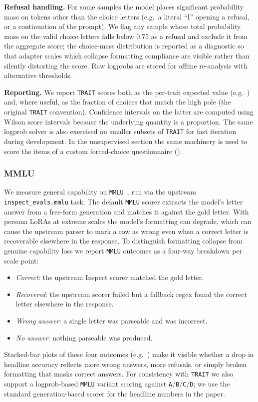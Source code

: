 \textbf{Refusal handling.}
For some samples the model places significant probability mass on tokens other than the choice letters (e.g.\ a literal ``I'' opening a refusal, or a continuation of the prompt). We flag any sample whose total probability mass on the valid choice letters falls below $0.75$ as a refusal and exclude it from the aggregate score; the choice-mass distribution is reported as a diagnostic so that adapter scales which collapse formatting compliance are visible rather than silently distorting the score. Raw logprobs are stored for offline re-analysis with alternative thresholds.

\textbf{Reporting.}
We report \texttt{TRAIT} scores both as the per-trait expected value (e.g.\ ) and, where useful, as the fraction of choices that match the high pole (the original \texttt{TRAIT} convention). Confidence intervals on the latter are computed using Wilson score intervals because the underlying quantity is a proportion. The same logprob solver is also exercised on smaller subsets of \texttt{TRAIT} for fast iteration during development. In the unsupervised section the same machinery is used to score the items of a custom forced-choice questionnaire ().

\subsubsection{MMLU}\label{sec:appendix-e-mcq-mmlu}

We measure general capability on \texttt{MMLU}~\citep{hendryckstest2021}, run via the upstream \texttt{inspect\_evals.mmlu} task. The default \texttt{MMLU} scorer extracts the model's letter answer from a free-form generation and matches it against the gold letter. With persona LoRAs at extreme scales the model's formatting can degrade, which can cause the upstream parser to mark a row as wrong even when a correct letter is recoverable elsewhere in the response. To distinguish formatting collapse from genuine capability loss we report \texttt{MMLU} outcomes as a four-way breakdown per scale point:
\begin{itemize}
    \item \emph{Correct}: the upstream Inspect scorer matched the gold letter.
    \item \emph{Recovered}: the upstream scorer failed but a fallback regex found the correct letter elsewhere in the response.
    \item \emph{Wrong answer}: a single letter was parseable and was incorrect.
    \item \emph{No answer}: nothing parseable was produced.
\end{itemize}
Stacked-bar plots of these four outcomes (e.g.\ ) make it visible whether a drop in headline accuracy reflects more wrong answers, more refusals, or simply broken formatting that masks correct answers. For consistency with \texttt{TRAIT} we also support a logprob-based \texttt{MMLU} variant scoring against \texttt{A}/\texttt{B}/\texttt{C}/\texttt{D}; we use the standard generation-based scorer for the headline numbers in the paper.

